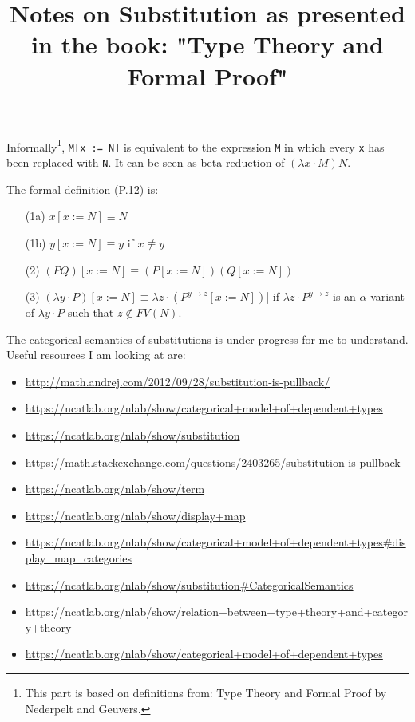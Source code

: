 \documentclass[12pt,fleqn]{article}
\title{Notes on Substitution as presented in the book: "Type Theory and Formal Proof"}
\begin{document}
\maketitle

Informally\footnote{This part is based on definitions from: Type Theory and Formal Proof by 
Nederpelt and Geuvers.}, 
\verb|M[x := N]| is equivalent to the expression \verb|M| in which every \verb|x| has been 
replaced with \verb|N|. It can be seen as beta-reduction of $(\lambda x \cdot M)N$. 

The formal definition (P.12) is: 
\begin{enumerate}
	\item[(1a)] $x[x := N] \equiv N$
	\item[(1b)] $y[x := N] \equiv y \text{ if } x \not\equiv y$
	\item[(2)] $(PQ)[x := N] \equiv (P[x := N]) (Q[x := N])$
	\item[(3)] $(\lambda y \cdot P)[x := N] \equiv \lambda z \cdot (P^{y \to 
	z}[x := N])$| if $\lambda z \cdot P^{y \to z} $ is an $\alpha$-variant of $\lambda y \cdot P$ 
	such that $z \notin FV(N)$.
	
\end{enumerate}
The categorical semantics of substitutions is under progress for me to understand. Useful 
resources I am looking at are: 
\begin{itemize}
	\item \url{http://math.andrej.com/2012/09/28/substitution-is-pullback/}
	\item \url{https://ncatlab.org/nlab/show/categorical+model+of+dependent+types}
	\item \url{https://ncatlab.org/nlab/show/substitution}
	\item \url{https://math.stackexchange.com/questions/2403265/substitution-is-pullback}
	\item \url{https://ncatlab.org/nlab/show/term}
	\item \url{https://ncatlab.org/nlab/show/display+map}
	\item 
	\url{https://ncatlab.org/nlab/show/categorical+model+of+dependent+types#display_map_categories}
	\item \url{https://ncatlab.org/nlab/show/substitution#CategoricalSemantics}
	\item \url{https://ncatlab.org/nlab/show/relation+between+type+theory+and+category+theory}
	\item \url{https://ncatlab.org/nlab/show/categorical+model+of+dependent+types}
\end{itemize}
\end{document}
